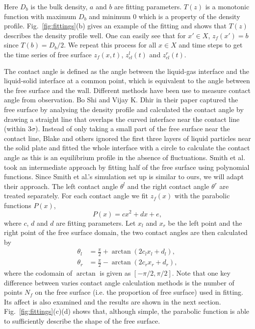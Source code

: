 \documentclass[
reprint,
 amsmath,amssymb,
 aps,
url
]{revtex4-1}
\begin{document}
Here $D_b$ is the bulk density, $a$ and $b$ are fitting parameters. $T(z)$ is a monotonic function with maximum $D_b$ and minimum $0$ which is a property of the density profile. Fig.~\ref{fig:fittings}(b) gives an example of the fitting and shows that $T(z)$ describes the density profile well. One can easily see that for $x'\in X$, $z_f(x') = b$ since $T(b)=D_b/2$. We repeat this process for all $x\in X$ and time steps to get the time series of free surface $z_f(x,t)$, $z_{cl}^l(t)$ and $z_{cl}^r(t)$.   


The contact angle is defined as the angle between the liquid-gas interface and the liquid-solid interface at a common point, which is equivalent to the angle between the free surface and the wall. Different methods have been use to measure contact angle from observation. Bo Shi and Vijay K. Dhir in their paper \cite{shi_molecular_2009} captured the free surface by analysing the density profile and calculated the contact angle by drawing a straight line that overlaps the curved interface near the contact line (within 3$\sigma$). Instead of only taking a small part of the free surface near the contact line, Blake and others \cite{blake_contact_1997,blake_forced_2015,fernandez-toledano_molecular-dynamics_2019} ignored the first three layers of liquid particles near the solid plate and fitted the whole interface with a circle to calculate the contact angle as this is an equilibrium profile in the absence of fluctuations. Smith et al. \cite{smith_langevin_2016} took an intermediate approach by fitting half of the free surface using polynomial functions. Since Smith et al.'s simulation set up is similar to ours, we will adapt their approach. The left contact angle $\theta^l$ and the right contact angle $\theta^r$ are treated separately. For each contact angle we fit $z_f(x)$ with the parabolic functions $P(x)$,
\begin{equation}
	\label{eq:parabolic}
	P(x) = cx^2+dx+e,
\end{equation}
where $c$, $d$ and $d$ are fitting parameters. Let $x_l$ and $x_r$ be the left point and the right point of the free surface domain, the two contact angles are then calculated by
\begin{align}
	\theta_l &= \frac{\pi}{2} + \arctan(2c_lx_l+d_l), \\
	\theta_r &= \frac{\pi}{2} - \arctan(2c_rx_r+d_r),
\end{align} 
where the codomain of $\arctan$ is given as $[-\pi/2,\pi/2]$. Note that one key difference between varies contact angle calculation methods is the number of points $N_f$ on the free surface (i.e. the proportion of free surface) used in fitting. Its affect is also examined and the results are shown in the next section. Fig.~\ref{fig:fittings}(c)(d) shows that, although simple, the parabolic function is able to sufficiently describe the shape of the free surface.
\end{document}
